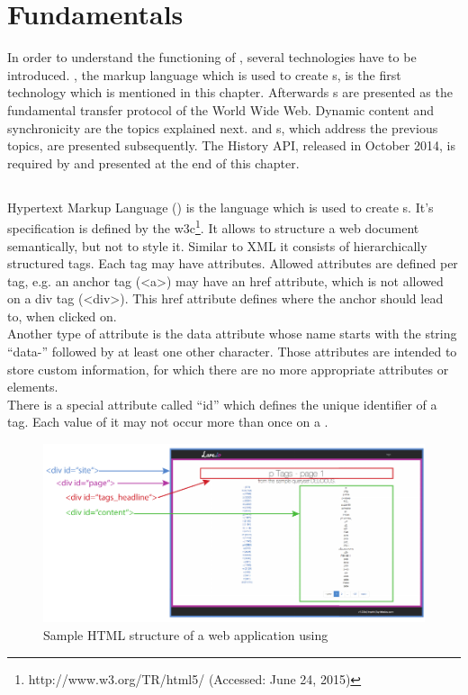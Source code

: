 \section{Fundamentals\label{chap:fundamentals}}

In order to understand the functioning of \lare{}, several technologies have to be introduced.
\html{}, the markup language which is used to create \webPage{}s, is the first technology which is mentioned in this chapter.
Afterwards \httpRequest{}s are presented as the fundamental transfer protocol of the World Wide Web.
Dynamic content and synchronicity are the topics explained next.
\ajax{} and \singlePageApplication{}s, which address the previous topics, are presented subsequently.
The History API, released in October 2014, is required by \lare{} and presented at the end of this chapter.

\subsection{\html{}\label{html}}
Hypertext Markup Language (\html{}) is the language which is used to create \webPage{}s.
It's specification is defined by the \gls{w3c}\footnote{http://www.w3.org/TR/html5/ (Accessed: June 24, 2015)}.
It allows to structure a web document semantically, but not to style it.
Similar to XML it consists of hierarchically structured tags.
Each tag may have attributes.
Allowed attributes are defined per tag, e.g. an anchor tag (<a>) may have an href attribute, which is not allowed on a div tag (<div>).
This href attribute defines where the anchor should lead to, when clicked on.
\\
Another type of attribute is the data attribute whose name starts with the string \enquote{data-} followed by at least one other character.
Those attributes are intended to store custom information, for which there are no more appropriate attributes or elements.
\\
There is a special attribute called \enquote{id} which defines the unique identifier of a tag.
Each value of it may not occur more than once on a \webPage{}.

\begin{figure}[H]
\centering
\includegraphics[width=13cm]{images/lare_html.pdf}
\caption[lare_html]{Sample HTML structure of a web application using \lare{}}
\label{fig:lare_html}
\end{figure}

